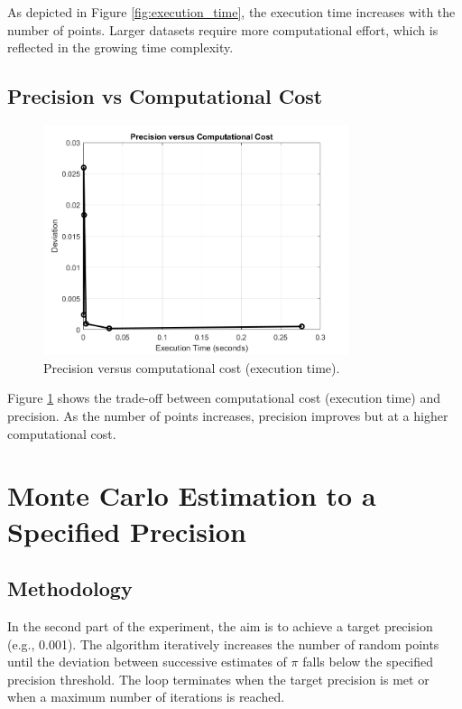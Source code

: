 \documentclass{article}
\begin{document}
As depicted in Figure \ref{fig:execution_time}, the execution time increases with the number of points. Larger datasets require more computational effort, which is reflected in the growing time complexity.

\subsection{Precision vs Computational Cost}
\begin{figure}[h!]
    \centering
    \includegraphics[width=0.8\textwidth]{precision_vs_cost_plot.png}
    \caption{Precision versus computational cost (execution time).}
    \label{fig:precision_cost}
\end{figure}

Figure \ref{fig:precision_cost} shows the trade-off between computational cost (execution time) and precision. As the number of points increases, precision improves but at a higher computational cost.

\section{Monte Carlo Estimation to a Specified Precision}
\subsection{Methodology}
In the second part of the experiment, the aim is to achieve a target precision (e.g., 0.001). The algorithm iteratively increases the number of random points until the deviation between successive estimates of $\pi$ falls below the specified precision threshold. The loop terminates when the target precision is met or when a maximum number of iterations is reached.
\end{document}
